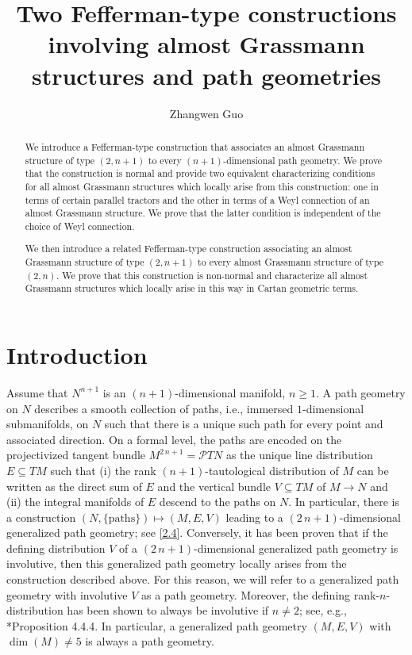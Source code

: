 \documentclass[11pt]{amsart}
\title[Two Fefferman-type constructions]{Two Fefferman-type constructions involving almost Grassmann structures and path geometries}
\author{Zhangwen Guo}
\begin{document}
\begin{abstract}
We introduce a Fefferman-type construction that associates an almost Grassmann structure of type $(2,n+1)$ to every $(n+1)$-dimensional path geometry. We prove that the construction is normal and provide two equivalent characterizing conditions for all almost Grassmann structures which locally arise from this construction: one in terms of certain parallel tractors and the other in terms of a Weyl connection of an almost Grassmann structure. We prove that the latter condition is independent of the choice of Weyl connection.

We then introduce a related Fefferman-type construction associating an almost Grassmann structure of type $(2,n+1)$ to every almost Grassmann structure of type $(2,n)$. We prove that this construction is non-normal and characterize all almost Grassmann structures which locally arise in this way in Cartan geometric terms.
\end{abstract}
	\maketitle 

\section{Introduction}
Assume that $N^{n+1}$ is an $(n+1)$-dimensional manifold, $n\geq 1$. A path geometry on $N$ describes a smooth collection of paths, i.e., immersed $1$-dimensional submanifolds, on $N$ such that there is a unique such path for every point and associated direction. On a formal level, the paths are encoded on the projectivized tangent bundle $M^{2\,n+1}=\mathcal PTN$ as the unique line distribution $E\subseteq TM$ such that (i) the rank $(n+1)$-tautological distribution of $M$ can be written as the direct sum of $E$ and the vertical bundle $V\subseteq TM$ of $M\to N$ and (ii) the integral manifolds of $E$ descend to the paths on $N$. In particular, there is a construction $(N,\{\text{paths}\})\mapsto(M,E,V)$
leading to a $(2\,n+1)$-dimensional generalized path geometry; see \cref{2.4}. Conversely,
it has been proven that if the defining distribution $V$ of a $(2\,n+1)$-dimensional generalized path geometry is involutive, then this generalized path geometry locally arises from the construction described above. For this reason, we will refer to a generalized path geometry with involutive $V$ as a path geometry. Moreover, the defining rank-$n$-distribution has been shown to always be involutive if $n\neq2$; see, e.g., \cite{Book}*{Proposition 4.4.4}. In particular, a generalized path geometry $(M,E,V)$ with $\dim(M)\neq 5$ is always a path geometry.
\end{document}
